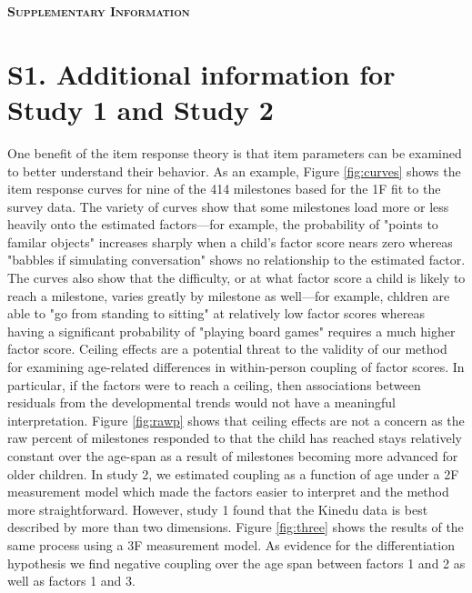 \documentclass{article}
\begin{document}
\begin{center}
\textbf{\textsc{\LARGE Supplementary Information}}\\
\end{center}

\section{S1. Additional information for Study 1 and Study 2}

One benefit of the item response theory is that item parameters can be examined to better understand their behavior. As an example, Figure \ref{fig:curves} shows the item response curves for nine of the 414 milestones based for the 1F fit to the survey data. The variety of curves show that some milestones load more or less heavily onto the estimated factors—for example, the probability of "points to familar objects" increases sharply when a child's factor score nears zero whereas "babbles if simulating conversation" shows no relationship to the estimated factor. The curves also show that the difficulty, or at what factor score a child is likely to reach a milestone, varies greatly by milestone as well—for example, chldren are able to "go from standing to sitting" at relatively low factor scores whereas having a significant probability of "playing board games" requires a much higher factor score.
Ceiling effects are a potential threat to the validity of our method for examining age-related differences in within-person coupling of factor scores. In particular, if the factors were to reach a ceiling, then associations between residuals from the developmental trends would not have a meaningful interpretation. Figure \ref{fig:rawp} shows that ceiling effects are not a concern as the raw percent of milestones responded to that the child has reached stays relatively constant over the age-span as a result of milestones becoming more advanced for older children.
In study 2, we estimated coupling as a function of age under a 2F measurement model which made the factors easier to interpret and the method more straightforward. However, study 1 found that the Kinedu data is best described by more than two dimensions. Figure \ref{fig:three} shows the results of the same process using a 3F measurement model. As evidence for the differentiation hypothesis we find negative coupling over the age span between factors 1 and 2 as well as factors 1 and 3.
\end{document}
